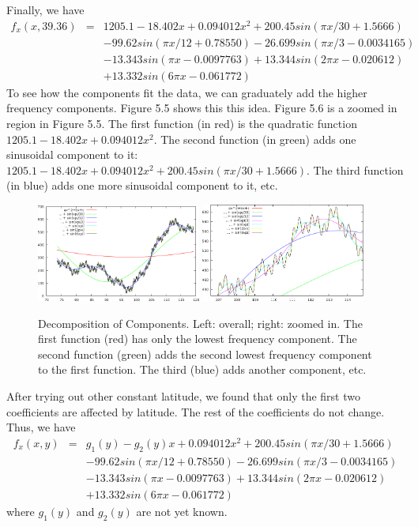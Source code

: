\documentclass[a4paper]{article}
\begin{document}
Finally, we have
\begin{eqnarray}
f_x(x,39.36) & = & 1205.1 -18.402x +0.094012x^2 +200.45sin(\pi x/30+1.5666) \nonumber \\
             &   & -99.62sin(\pi x/12+0.78550) -26.699sin(\pi x/3-0.0034165) \nonumber \\
             &   & -13.343sin(\pi x-0.0097763) +13.344sin(2\pi x-0.020612) \nonumber \\
             &   & +13.332sin(6\pi x-0.061772)
\end{eqnarray}
To see how the components fit the data, we can graduately add
the higher frequency components. Figure 5.5 shows this this idea. Figure 5.6 is
a zoomed in region in Figure 5.5. The first function (in red) is the quadratic
function $1205.1 -18.402x +0.094012x^2$. The second function (in green) adds
one sinusoidal component to it: $1205.1 -18.402x +0.094012x^2 +200.45sin(\pi
x/30+1.5666)$. The third function (in blue) adds one more sinusoidal component
to it, etc.
\begin{figure}[htb]
\begin{center}
\includegraphics[width=0.48\textwidth]{fxx-lc3.png}
\includegraphics[width=0.48\textwidth]{fxx-lc4.png}
\end{center}
\caption{Decomposition of Components.
Left: overall; right: zoomed in.
The first function (red) has only the lowest frequency component.
The second function (green) adds the second lowest frequency component to the
first function.
The third (blue) adds another component, etc.}
\label{fig:fxx-lc3}
\end{figure}

After trying out other constant latitude, we found that only the first two
coefficients are affected by latitude. The rest of the coefficients do not
change. Thus, we have
\begin{eqnarray}
f_x(x,y) &=& g_1(y) -g_2(y)x +0.094012x^2 +200.45sin(\pi x/30+1.5666) \nonumber \\
         & & -99.62sin(\pi x/12+0.78550) -26.699sin(\pi x/3-0.0034165) \nonumber \\
         & & -13.343sin(\pi x-0.0097763) +13.344sin(2\pi x-0.020612) \nonumber \\
         & & +13.332sin(6\pi x-0.061772)
\end{eqnarray}
where $g_1(y)$ and $g_2(y)$ are not yet known.
\end{document}
